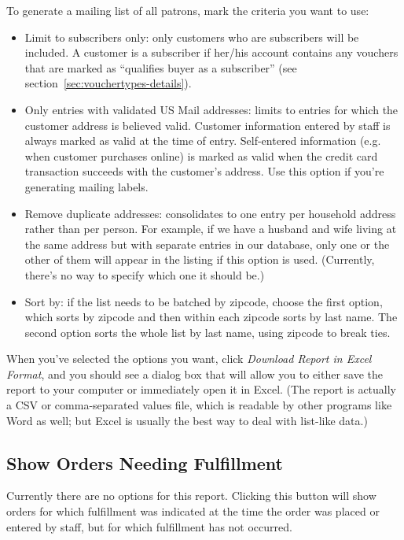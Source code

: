 To generate a mailing list of all patrons, mark the criteria you want to
use:
\begin{itemize}
\item Limit to subscribers only: only customers who are subscribers will
  be included. A customer is a subscriber if her/his account contains
  any vouchers that are marked as ``qualifies buyer as a subscriber''
  (see section~\ref{sec:vouchertypes-details}).
\item Only entries with validated US Mail addresses: limits to entries
  for which the customer address is believed valid.  Customer
  information entered by staff is always marked as valid at the time of
  entry.  Self-entered information (e.g. when customer purchases online)
  is marked as valid when the credit card transaction succeeds with the
  customer's address.  Use this option if you're generating mailing
  labels.
\item Remove duplicate addresses: consolidates to one entry per
  household address rather than per person.  For example, if we have a
  husband and wife living at the same address but with separate entries
  in our database, only one or the other of them will appear in the
  listing if this option is used.  (Currently, there's no way to specify
  which one it should be.)
\item Sort by: if the list needs to be batched by zipcode, choose the
  first option, which sorts by zipcode and then within each zipcode
  sorts by last name.  The second option sorts the whole list by last
  name, using zipcode to break ties.
\end{itemize}

When you've selected the options you want, click \emph{Download Report
in Excel Format}, and you should see a dialog box that will allow you to
either save the report to your computer or immediately open it in
Excel.  (The report is actually a CSV or comma-separated values file,
which is readable by other programs like Word as well; but Excel is
usually the best way to deal with list-like data.)

\subsection{Show Orders Needing Fulfillment}
\label{sec:report_unfulfilled}

Currently there are no options for this report. Clicking this button
will show orders for which fulfillment was indicated at the time the
order was placed or entered by staff, but for which fulfillment has not
occurred. 

